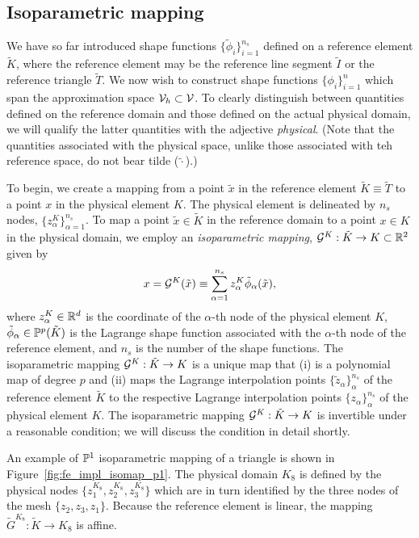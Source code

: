 \subsection{Isoparametric mapping}
\label{sec:fe_iso_map}
We have so far introduced shape functions $\{\tilde \phi_i\}_{i=1}^{n_s}$ defined on a reference element $\tilde K$, where the reference element may be the reference line segment $\tilde I$ or the reference triangle $\tilde T$. We now wish to construct shape functions $\{\phi_i\}_{i=1}^n$ which span the approximation space $\mathcal{V}_h \subset \mathcal{V}$.  To clearly distinguish between quantities defined on the reference domain and those defined on the actual physical domain, we will qualify the latter quantities with the adjective \emph{physical}. (Note that the quantities associated with the physical space, unlike those associated with teh reference space, do not bear tilde ($\tilde \cdot$).)

To begin, we create a mapping from a point $\tilde x$ in the reference element $\tilde K \equiv \tilde T$ to a point $x$ in the physical element $K$.  The physical element is delineated by $n_s$ nodes, $\{ z^K_\alpha \}_{\alpha=1}^{n_s}$.  To map a point $\tilde x \in \tilde K$ in the reference domain to a point $x \in K$ in the physical domain, we employ an \emph{isoparametric mapping}, $\mathcal{G}^K: \tilde K \to K \subset \mathbb{R}^2$ given by 
\begin{equation}
  x = \mathcal{G}^K(\tilde x) \equiv \sum_{\alpha=1}^{n_s} z^K_\alpha \tilde \phi_\alpha(\tilde x) ,
  \label{eq:fe_iso_map}
\end{equation}
where $z^K_\alpha \in \mathbb{R}^d$ is the coordinate of the $\alpha$-th node of the physical element $K$, $\tilde \phi_\alpha \in \mathbb{P}^p(\tilde K)$ is the Lagrange shape function associated with the $\alpha$-th node of the reference element, and $n_s$ is the number of the shape functions.  The isoparametric mapping $\mathcal{G}^K: \tilde K \to K$ is a unique map that (i) is a polynomial map of degree $p$ and (ii) maps the Lagrange interpolation points $\{ \tilde z_\alpha \}_{\alpha}^{n_s}$ of the reference element $\tilde K$ to the respective Lagrange interpolation points $\{ z_\alpha \}_{\alpha}^{n_s}$ of the physical element $K$. The isoparametric mapping $\mathcal{G}^K: \tilde K \to K$ is invertible under a reasonable condition; we will discuss the condition in detail shortly.

An example of $\mathbb{P}^1$ isoparametric mapping of a triangle is shown in Figure~\ref{fig:fe_impl_isomap_p1}.  The physical domain $K_8$ is defined by the physical nodes $\{ z_1^{K_8}, z_2^{K_8}, z_3^{K_8} \}$ which are in turn identified by the three nodes of the mesh $\{ z_2, z_3, z_1 \}$.  Because the reference element is linear, the mapping $\tilde G^{K_8}: \tilde K \to K_8$ is affine.

